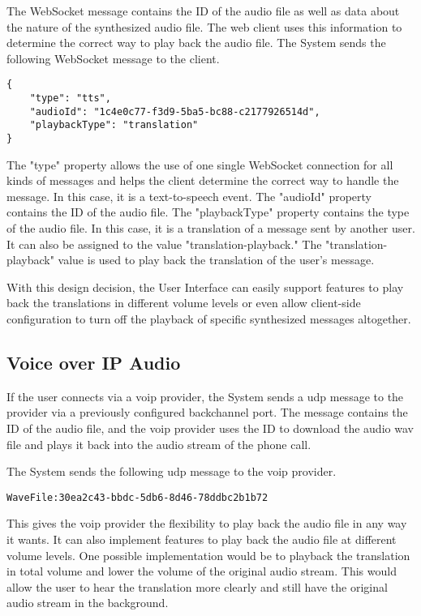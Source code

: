 The WebSocket message contains the ID of the audio file as well as data about the nature of the synthesized audio file. 
The web client uses this information to determine the correct way to play back the audio file. The System sends the 
following WebSocket message to the client.

\begin{verbatim}
{
    "type": "tts",
    "audioId": "1c4e0c77-f3d9-5ba5-bc88-c2177926514d",
    "playbackType": "translation"
}
\end{verbatim}

The "type" property allows the use of one single WebSocket connection for all kinds of messages and helps the client 
determine the correct way to handle the message. In this case, it is a text-to-speech event. The "audioId" property 
contains the ID of the audio file. The "playbackType" property contains the type of the audio file. In this case, it is 
a translation of a message sent by another user. It can also be assigned to the value "translation-playback." The 
"translation-playback" value is used to play back the translation of the user's message.

With this design decision, the User Interface can easily support features to play back the translations in different 
volume levels or even allow client-side configuration to turn off the playback of specific synthesized messages 
altogether.

\subsection{Voice over IP Audio}

If the user connects via a \ac{voip} provider, the System sends a \ac{udp} message to the provider via a previously 
configured backchannel port. The message contains the ID of the audio file, and the \ac{voip} provider uses the ID to 
download the audio \ac{wav} file and plays it back into the audio stream of the phone call.

The System sends the following \ac{udp} message to the \ac{voip} provider. 

\begin{verbatim}
WaveFile:30ea2c43-bbdc-5db6-8d46-78ddbc2b1b72
\end{verbatim}

This gives the \ac{voip} provider the flexibility to play back the audio file in any way it wants. It can also 
implement features to play back the audio file at different volume levels. One possible implementation would be to 
playback the translation in total volume and lower the volume of the original audio stream. This would allow the user 
to hear the translation more clearly and still have the original audio stream in the background.

